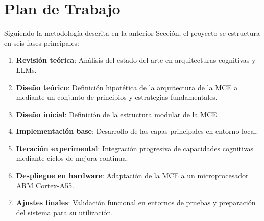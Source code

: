 \section{Plan de Trabajo}
Siguiendo la metodología descrita en la anterior Sección, el proyecto se estructura en seis fases principales:


\begin{enumerate}

    \item \textbf{Revisión teórica}: Análisis del estado del arte en
    arquitecturas cognitivas y LLMs.

    \item \textbf{Diseño teórico}: Definición hipotética de la arquitectura de la MCE
    a mediante un conjunto de principios y estrategias fundamentales.
    
    \item \textbf{Diseño inicial}: Definición de la estructura modular de la
    MCE.
    
    \item \textbf{Implementación base}: Desarrollo de las capas principales en
    entorno local.
    
    \item \textbf{Iteración experimental}: Integración progresiva de capacidades
    cognitivas mediante ciclos de mejora continua.
    
    \item \textbf{Despliegue en hardware}: Adaptación de la MCE a un
    microprocesador ARM Cortex-A55.
    
    \item \textbf{Ajustes finales}: Validación funcional en entornos de pruebas y
    preparación del sistema para su utilización.

\end{enumerate}

